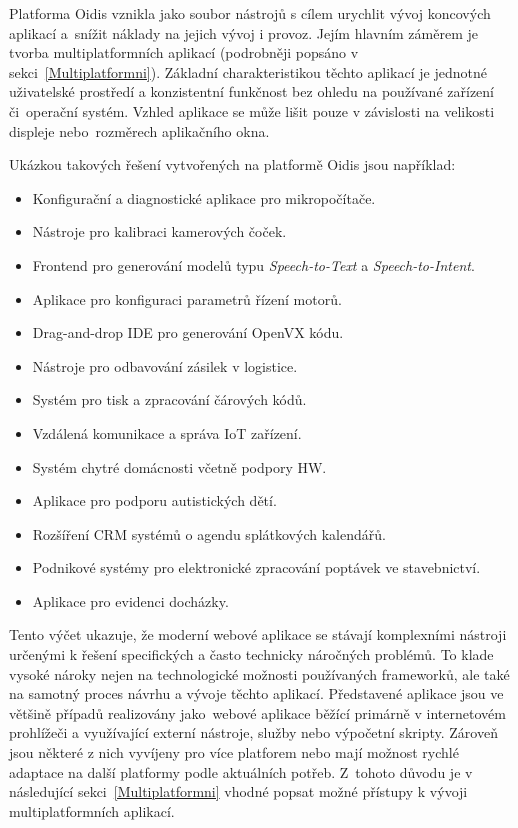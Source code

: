 Platforma Oidis vznikla jako soubor nástrojů s cílem urychlit vývoj koncových aplikací a~snížit náklady na jejich vývoj i provoz. Jejím hlavním záměrem je tvorba multiplatformních aplikací (podrobněji popsáno v sekci~\ref{Multiplatformni}). Základní charakteristikou těchto aplikací je jednotné uživatelské prostředí a konzistentní funkčnost bez ohledu na používané zařízení či~operační systém. Vzhled aplikace se může lišit pouze v závislosti na velikosti displeje nebo~rozměrech aplikačního okna.

Ukázkou takových řešení vytvořených na platformě Oidis jsou například:
\begin{itemize}
\item Konfigurační a diagnostické aplikace pro mikropočítače.
\item Nástroje pro kalibraci kamerových čoček.
\item Frontend pro generování modelů typu \textit{Speech-to-Text} a \textit{Speech-to-Intent}.
\item Aplikace pro konfiguraci parametrů řízení motorů.
\item Drag-and-drop IDE pro generování OpenVX kódu.
\item Nástroje pro odbavování zásilek v logistice.
\item Systém pro tisk a zpracování čárových kódů.
\item Vzdálená komunikace a správa IoT zařízení.
\item Systém chytré domácnosti včetně podpory HW.
\item Aplikace pro podporu autistických dětí.
\item Rozšíření CRM systémů o agendu splátkových kalendářů.
\item Podnikové systémy pro elektronické zpracování poptávek ve stavebnictví.
\item Aplikace pro evidenci docházky.
\end{itemize}

Tento výčet ukazuje, že moderní webové aplikace se stávají komplexními nástroji určenými k řešení specifických a často technicky náročných problémů. To klade vysoké nároky nejen na technologické možnosti používaných frameworků, ale také na samotný proces návrhu a vývoje těchto aplikací. Představené aplikace jsou ve většině případů realizovány jako~webové aplikace běžící primárně v internetovém prohlížeči a využívající externí nástroje, služby nebo výpočetní skripty. Zároveň jsou některé z nich vyvíjeny pro více platforem nebo mají možnost rychlé adaptace na další platformy podle aktuálních potřeb. Z~tohoto důvodu je v následující sekci~\ref{Multiplatformni} vhodné popsat možné přístupy k vývoji multiplatformních aplikací.

